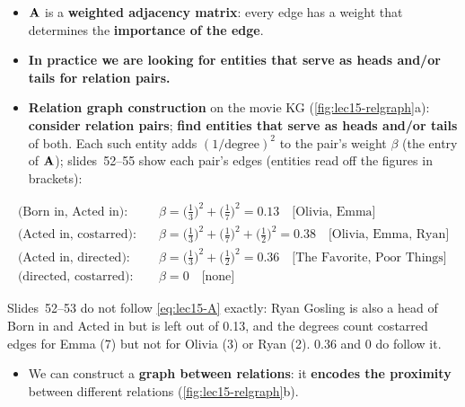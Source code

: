 \begin{itemize}
  \item $\mathbf{A}$ is a \textbf{weighted adjacency matrix}: every edge has a weight that
    determines the \textbf{importance of the edge}.
  \item \textbf{In practice we are looking for entities that serve as heads and/or tails
    for relation pairs.}
  \item \textbf{Relation graph construction} on the movie KG (\cref{fig:lec15-relgraph}a):
    \textbf{consider relation pairs}; \textbf{find entities that serve as heads and/or
    tails} of both. Each such entity adds $(1/\text{degree})^2$ to the pair's weight
    $\beta$ (the entry of $\mathbf{A}$); slides~52--55 show each pair's edges (entities
    read off the figures in brackets):
\end{itemize}
\begin{align}
  \text{(Born in, Acted in):}\quad
    & \beta = \Big(\frac{1}{3}\Big)^2 + \Big(\frac{1}{7}\Big)^2 = 0.13
    \quad\text{[Olivia, Emma]} \label{eq:lec15-beta1}\\
  \text{(Acted in, costarred):}\quad
    & \beta = \Big(\frac{1}{3}\Big)^2 + \Big(\frac{1}{7}\Big)^2 + \Big(\frac{1}{2}\Big)^2
      = 0.38 \quad\text{[Olivia, Emma, Ryan]} \label{eq:lec15-beta2}\\
  \text{(Acted in, directed):}\quad
    & \beta = \Big(\frac{1}{3}\Big)^2 + \Big(\frac{1}{2}\Big)^2 = 0.36
    \quad\text{[The Favorite, Poor Things]} \label{eq:lec15-beta3}\\
  \text{(directed, costarred):}\quad
    & \beta = 0 \quad\text{[none]} \label{eq:lec15-beta4}
\end{align}
\begin{caution}
  Slides~52--53 do not follow \cref{eq:lec15-A} exactly: Ryan Gosling is also a head of
  Born in and Acted in but is left out of 0.13, and the degrees count costarred edges
  for Emma (7) but not for Olivia (3) or Ryan (2). 0.36 and 0 do follow it.
\end{caution}
\begin{itemize}
  \item We can construct a \textbf{graph between relations}: it \textbf{encodes the
    proximity} between different relations (\cref{fig:lec15-relgraph}b).
\end{itemize}

